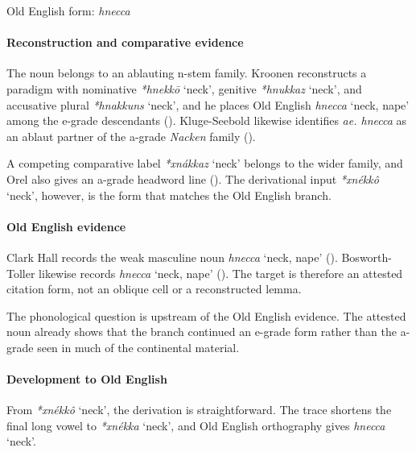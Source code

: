 \documentclass[
  british,
  a4paper,
]{article}
\providecommand{\Recon}[1]{\emph{*#1}}
\begin{document}
Old English form: \emph{hnecca}

\paragraph{Reconstruction and comparative
evidence}\label{reconstruction-and-comparative-evidence-106}

The noun belongs to an ablauting n-stem family. Kroonen reconstructs a
paradigm with nominative \Recon{hnekkō} `neck', genitive \Recon{hnukkaz}
`neck', and accusative plural \Recon{hnakkuns} `neck', and he places Old
English {\emph{hnecca}} `neck, nape' among the e-grade descendants
(). Kluge-Seebold likewise
identifies \emph{ae. hnecca} as an ablaut partner of the a-grade
\emph{Nacken} family ().

A competing comparative label \Recon{xnákkaz} `neck' belongs to the
wider family, and Orel also gives an a-grade headword line
(). The derivational input
\Recon{xnékkô} `neck', however, is the form that matches the Old English
branch.

\paragraph{Old English evidence}\label{old-english-evidence-108}

Clark Hall records the weak masculine noun {\emph{hnecca}} `neck, nape'
(). Bosworth-Toller
likewise records {\emph{hnecca}} `neck, nape'
(). The
target is therefore an attested citation form, not an oblique cell or a
reconstructed lemma.

The phonological question is upstream of the Old English evidence. The
attested noun already shows that the branch continued an e-grade form
rather than the a-grade seen in much of the continental material.

\paragraph{Development to Old
English}\label{development-to-old-english-106}

From \Recon{xnékkô} `neck', the derivation is straightforward. The trace
shortens the final long vowel to \Recon{xnékka} `neck', and Old English
orthography gives {\emph{hnecca}} `neck'.
\end{document}
